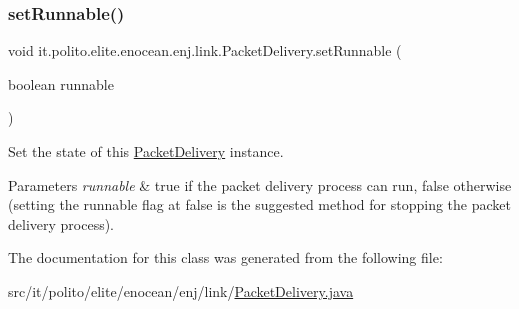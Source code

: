 \subsubsection{\texorpdfstring{set\+Runnable()}{setRunnable()}}
{\footnotesize\ttfamily void it.\+polito.\+elite.\+enocean.\+enj.\+link.\+Packet\+Delivery.\+set\+Runnable (\begin{DoxyParamCaption}\item[{boolean}]{runnable }\end{DoxyParamCaption})}

Set the state of this \hyperlink{classit_1_1polito_1_1elite_1_1enocean_1_1enj_1_1link_1_1_packet_delivery}{Packet\+Delivery} instance.


\begin{DoxyParams}{Parameters}
{\em runnable} & true if the packet delivery process can run, false otherwise (setting the runnable flag at false is the suggested method for stopping the packet delivery process). \\
\hline
\end{DoxyParams}


The documentation for this class was generated from the following file\+:\begin{DoxyCompactItemize}
\item 
src/it/polito/elite/enocean/enj/link/\hyperlink{_packet_delivery_8java}{Packet\+Delivery.\+java}\end{DoxyCompactItemize}
